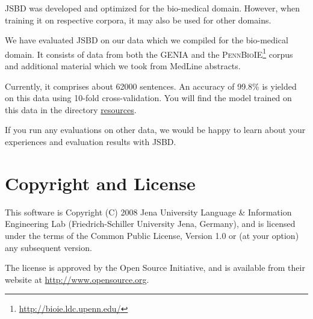 \documentclass[11pt,a4paper,halfparskip]{scrartcl}
\begin{document}
JSBD was developed and optimized for the bio-medical domain. However,
when training it on respective corpora, it may also be used for other
domains.

We have evaluated JSBD on our data which we compiled for the
bio-medical domain. It consists of data from both the GENIA
\cite{ohta2002} and the
\textsc{PennBioIE}\footnote{\url{http://bioie.ldc.upenn.edu/}} corpus
and additional material which we took from MedLine abstracts.

Currently, it comprises about 62000 sentences. An accuracy of 99.8\% is
yielded on this data using 10-fold cross-validation.  You will find
the model trained on this data in the directory \url{resources}.

If you run any evaluations on other data, we would be happy to learn
about your experiences and evaluation results with JSBD.





\section{Copyright and License}
This software is Copyright (C) 2008 Jena University Language \& Information
Engineering Lab (Friedrich-Schiller University Jena, Germany), and is
licensed under the terms of the Common Public License, Version 1.0 or (at
your option) any subsequent version.

The license is approved by the Open Source Initiative, and is
available from their website at \url{http://www.opensource.org}.



\end{document}
